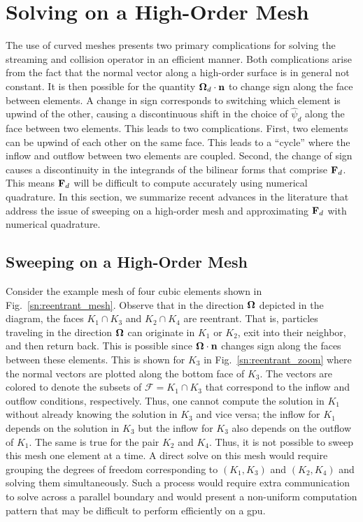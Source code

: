 \documentclass[../doc.tex]{subfiles}
\begin{document}
\section{Solving on a High-Order Mesh} \label{sn_sec:hosweep}
The use of curved meshes presents two primary complications for solving the streaming and collision operator in an efficient manner. Both complications arise from the fact that the normal vector along a high-order surface is in general not constant. It is then possible for the quantity $\boldsymbol{\Omega}_d\cdot\boldsymbol{\mathrm{n}}$ to change sign along the face between elements. A change in sign corresponds to switching which element is upwind of the other, causing a discontinuous shift in the choice of $\widehat{\psi}_d$ along the face between two elements. This leads to two complications. First, two elements can be upwind of each other on the same face. This leads to a ``cycle'' where the inflow and outflow between two elements are coupled. Second, the change of sign causes a discontinuity in the integrands of the bilinear forms that comprise $\boldsymbol{\mathrm{F}}_d$. This means $\boldsymbol{\mathrm{F}}_d$ will be difficult to compute accurately using numerical quadrature. In this section, we summarize recent advances in the literature that address the issue of sweeping on a high-order mesh and approximating $\boldsymbol{\mathrm{F}}_d$ with numerical quadrature. 

\subsection{Sweeping on a High-Order Mesh}
Consider the example mesh of four cubic elements shown in Fig.~\ref{sn:reentrant_mesh}. 
Observe that in the direction $\boldsymbol{\Omega}$ depicted in the diagram, the faces $K_1 \cap K_3$ and $K_2 \cap K_4$ are reentrant. That is, particles traveling in the direction $\boldsymbol{\Omega}$ can originate in $K_1$ or $K_2$, exit into their neighbor, and then return back. This is possible since $\boldsymbol{\Omega}\cdot\boldsymbol{\mathrm{n}}$ changes sign along the faces between these elements. This is shown for $K_3$ in Fig.~\ref{sn:reentrant_zoom} where the normal vectors are plotted along the bottom face of $K_3$. The vectors are colored to denote the subsets of $\mathcal{F} = K_1\cap K_3$ that correspond to the inflow and outflow conditions, respectively. Thus, one cannot compute the solution in $K_1$ without already knowing the solution in $K_3$ and vice versa; the inflow for $K_1$ depends on the solution in $K_3$ but the inflow for $K_3$ also depends on the outflow of $K_1$. The same is true for the pair $K_2$ and $K_4$. Thus, it is not possible to sweep this mesh one element at a time. A direct solve on this mesh would require grouping the degrees of freedom corresponding to $(K_1, K_3)$ and $(K_2,K_4)$ and solving them simultaneously. Such a process would require extra communication to solve across a parallel boundary and would present a non-uniform computation pattern that may be difficult to perform efficiently on a \gls{gpu}.  
\end{document}
